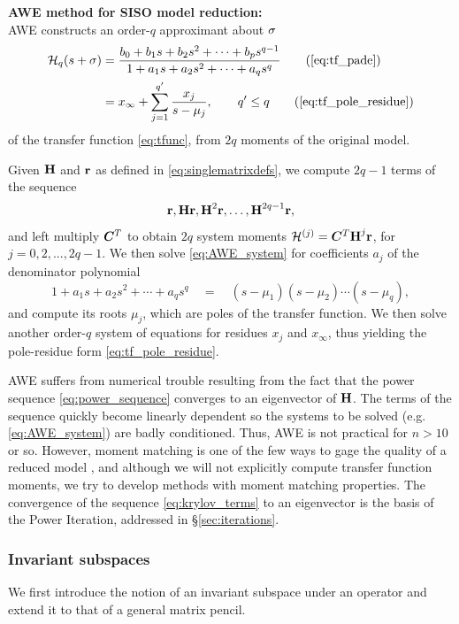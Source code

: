 \begin{description}
\item{\bf AWE  method for SISO model reduction:}\cite{AWE} \\
AWE constructs an order-$q$ \pade{} approximant about $\sigma$
\begin{align}
\tf_q(s+\xp) &=  \frac{b_0 + b_1 s + b_2 s^2 +  \cdots + b_ps^{q-1}}%
		{1 + a_1 s + a_2 s^2 + \cdots + a_q s^q}\tag{\ref{eq:tf_pade}}\\
	&= x_\infty + \sum_{j=1}^{q^\prime} \frac{x_j}{s-\mu_j}, \qquad q^\prime\leq q
\tag{\ref{eq:tf_pole_residue}}
\end{align} 
 of the transfer function \eqref{eq:tfunc}, from $2q$ moments of the original model.  

Given $\textbf{\textup{H}}$ and $\textbf{\textup{r}}$ as defined in 
\eqref{eq:singlematrixdefs}, we compute $2q-1$ terms of the sequence
\begin{equation}
 \textbf{\textup{r}}, \textbf{\textup{H}} \textbf{\textup{r}},  \textbf{\textup{H}}^2 \textbf{\textup{r}}, \ldots, \textbf{\textup{H}}^{2q-1} \textbf{\textup{r}},
\label{eq:krylov_terms}
\end{equation}
and left multiply $\bm{C}^T$ to obtain $2q$ system moments $\mathcal{H}^{(j)} = \bm{C}^T \textbf{\textup{H}}^j \textbf{\textup{r}}$, for $j=0,2,...,2q-1$.  We then solve  \eqref{eq:AWE_system} for coefficients $a_j$ of the denominator polynomial 
\[
1 + a_1 s + a_2 s^2 + \cdots + a_q s^q 
    \quad =  \quad (s-\mu_1)(s-\mu_2)\cdots (s-\mu_q),
\]   
and compute its roots $\mu_j$, which are poles of the transfer function.  We then solve another order-$q$ system of equations for residues $x_j$ and $x_\infty$,  thus yielding the pole-residue form \eqref{eq:tf_pole_residue}. 
\end{description}

\medskip
 AWE suffers from numerical trouble resulting from the fact that the power sequence \eqref{eq:power_sequence} converges to an eigenvector of $\textbf{\textup{H}}$.  
  The terms of the sequence quickly become linearly dependent so the systems to be solved (e.g. \eqref{eq:AWE_system}) are badly conditioned.    Thus, AWE is not practical for $n>10$ or so.    However, moment matching is one of the few ways  to gage the quality of a reduced model , and although we will not explicitly compute transfer function moments,  we try to develop methods with moment matching properties.   The convergence of the sequence \eqref{eq:krylov_terms} to an eigenvector is the basis of the Power Iteration, addressed in \S\ref{sec:iterations}.




\subsubsection{Invariant subspaces}\label{sec:invariant_subspaces}
We first introduce the notion of an invariant subspace under an operator and extend it to that of a general matrix pencil.
 
